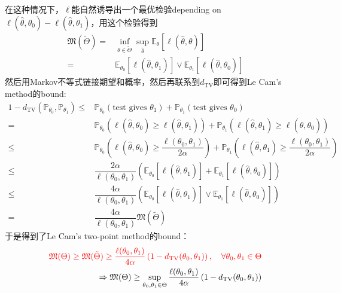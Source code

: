 \documentclass[11pt,a4paper]{ctexart}
\numberwithin{equation}{section}%
\begin{document}
在这种情况下，$ \ell $能自然诱导出一个最优检验depending on $ \ell(\hat{\theta },\theta _0)-\ell(\hat{\theta },\theta _1) $，用这个检验得到
\begin{align*}
    \mathfrak{M}(\tilde{\Theta}) =& \mathop{ \inf }\limits_{\theta \in \tilde{\Theta }} \mathop{ \sup  }\limits_{\hat{\theta }} \mathbb{E}_\theta\left[ \ell(\hat{\theta},\theta) \right] \\
    = & \mathbb{E}_{\theta _0}\left[ \ell(\hat{\theta },\theta _1) \right] \vee \mathbb{E}_{\theta _1}\left[ \ell(\hat{\theta },\theta _0) \right] 
\end{align*}
然后用Markov不等式链接期望和概率，然后再联系到$ d_{\mathrm{ TV } } $即可得到Le Cam's method的bound:
\begin{align*}
    1-d_{\mathrm{ TV } }(\mathbb{P}_{\theta _0},\mathbb{P}_{\theta _1}) \leq & \mathbb{P}_{\theta _0}\left( \text{test gives }\theta _1 \right) + \mathbb{P}_{\theta _1}\left( \text{test gives }\theta _0 \right) \\
    =& \mathbb{P}_{\theta _0}\left(  \ell(\hat{\theta },\theta _0) \geq \ell(\hat{\theta },\theta _1) \right)  + \mathbb{P}_{\theta _1}\left( \ell(\hat{\theta },\theta _1) \geq  \ell(\hat{\theta },\theta _0) \right) \\
    \leq & \mathbb{P}_{\theta _0}\left(   \ell(\hat{\theta },\theta _0) \geq \dfrac{ \ell(\theta _0,\theta _1) }{ 2\alpha  }  \right) + \mathbb{P}_{\theta _1}\left( \ell(\hat{\theta },\theta _1) \geq \dfrac{ \ell(\theta _0,\theta _1) }{ 2\alpha  }  \right) \\
    \leq & \dfrac{ 2\alpha  }{ \ell(\theta _0,\theta _1) }\left( \mathbb{E}_{\theta _0}\left[ \ell(\hat{\theta },\theta _1) \right] + \mathbb{E}_{\theta _1}\left[ \ell(\hat{\theta },\theta _0) \right] \right)\\
    \leq & \dfrac{ 4\alpha  }{ \ell(\theta _0,\theta _1) }\left( \mathbb{E}_{\theta _0}\left[ \ell(\hat{\theta },\theta _1) \right] \vee \mathbb{E}_{\theta _1}\left[ \ell(\hat{\theta },\theta _0) \right] \right)\\
    =& \dfrac{ 4\alpha  }{ \ell(\theta _0,\theta _1) }\mathfrak{M}(\tilde{\Theta})
\end{align*}
于是得到了{\color{red}Le Cam's two-point method}的bound：
\begin{align*}
    {\color{red}\mathfrak{M}(\Theta)\geq \mathfrak{M}( \tilde{\Theta})\geq \dfrac{ \ell(\theta _0,\theta _1) }{ 4\alpha  }\left( 1-d_{\mathrm{ TV } }(\theta_0,\theta _1) \right),\quad \forall \theta _0,\theta _1\in \Theta}\\
     \Rightarrow \mathfrak{M}(\Theta)\geq \mathop{ \sup  }\limits_{\theta _0,\theta _1\in \Theta } \dfrac{ \ell(\theta _0,\theta _1) }{ 4\alpha  }\left( 1-d_{\mathrm{ TV } }(\theta_0,\theta _1) \right) 
\end{align*}
\end{document}
